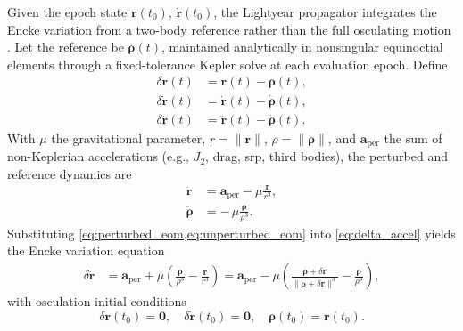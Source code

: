        Given the epoch state \(\boldsymbol{r}(t_0),\,\dot{\boldsymbol{r}}(t_0)\), the Lightyear propagator integrates the Encke variation from a two-body reference rather than the full osculating motion \cite{montenbruck2000,vallado2013,battin1999}. Let the reference be \(\boldsymbol{\rho}(t)\), maintained analytically in nonsingular equinoctial elements \cite{Walker1985} through a fixed-tolerance Kepler solve at each evaluation epoch. Define
        \begin{subequations}\label{eq:delta_defs}
        \begin{align}
        \delta\boldsymbol{r}(t) &= \boldsymbol{r}(t)-\boldsymbol{\rho}(t), \label{eq:delta_r}\\
        \delta\dot{\boldsymbol{r}}(t) &= \dot{\boldsymbol{r}}(t)-\dot{\boldsymbol{\rho}}(t), \label{eq:delta_v}\\
        \delta\ddot{\boldsymbol{r}}(t) &= \ddot{\boldsymbol{r}}(t)-\ddot{\boldsymbol{\rho}}(t). \label{eq:delta_accel}
        \end{align}
        \end{subequations}
        With \(\mu\) the gravitational parameter, \(r=\|\boldsymbol{r}\|\), \(\rho=\|\boldsymbol{\rho}\|\), and \(\boldsymbol{a}_{\mathrm{per}}\) the sum of non-Keplerian accelerations (e.g., \(J_2\), drag, \gls{srp}, third bodies), the perturbed and reference dynamics are
        \begin{align}
        \ddot{\boldsymbol{r}} &= \boldsymbol{a}_{\mathrm{per}} - \mu \frac{\boldsymbol{r}}{r^{3}}, \label{eq:perturbed_eom}\\
        \ddot{\boldsymbol{\rho}} &= -\,\mu \frac{\boldsymbol{\rho}}{\rho^{3}}. \label{eq:unperturbed_eom}
        \end{align}
        Substituting \cref{eq:perturbed_eom,eq:unperturbed_eom} into \cref{eq:delta_accel} yields the Encke variation equation
        \begin{align}
        \delta\ddot{\boldsymbol{r}}
          &= \boldsymbol{a}_{\mathrm{per}}
           + \mu\!\left(\frac{\boldsymbol{\rho}}{\rho^{3}}-\frac{\boldsymbol{r}}{r^{3}}\right)
           = \boldsymbol{a}_{\mathrm{per}}
           - \mu\!\left(\frac{\boldsymbol{\rho}+\delta\boldsymbol{r}}{\|\boldsymbol{\rho}+\delta\boldsymbol{r}\|^{3}}
                       - \frac{\boldsymbol{\rho}}{\rho^{3}}\right), \label{eq:encke}
        \end{align}
        with osculation initial conditions
        \[
        \delta\boldsymbol{r}(t_0)=\boldsymbol{0},\quad
        \delta\dot{\boldsymbol{r}}(t_0)=\boldsymbol{0},\quad
        \boldsymbol{\rho}(t_0)=\boldsymbol{r}(t_0).
        \]
